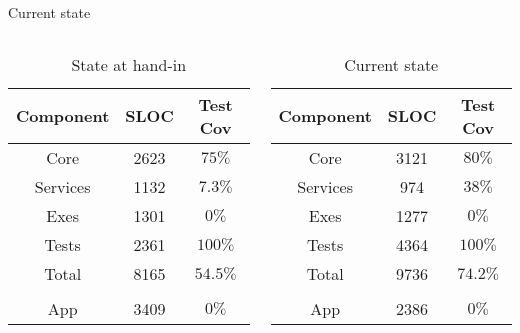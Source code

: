 \documentclass[a4paper]{beamer}
\begin{document}
\begin{frame}{Current state}
    \begin{columns}
        \begin{column}{0.48\textwidth}
            \begin{table}
                \centering
                \begin{tabular}{c|c|c}
                    Component & SLOC  & Test Cov\\
                    \hline
                    Core      & 2623 & $75\%$\\
                    Services  & 1132 & $7.3\%$\\
                    Exes      & 1301 & $0\%$\\
                    Tests     & 2361 & $100\%$\\
                    \hline
                    Total     & 8165 & $54.5\%$\\
                    &&\\
                    App       & 3409 & $0\%$
                \end{tabular}
                \caption{State at hand-in}
            \end{table}
        \end{column}
        \begin{column}{0.48\textwidth}
            \begin{table}
                \centering
                \begin{tabular}{c|c|c}
                    Component & SLOC  & Test Cov\\
                    \hline
                    Core      & 3121 & $80\%$\\
                    Services  &  974 & $38\%$\\
                    Exes      & 1277 & $0\%$\\
                    Tests     & 4364 & $100\%$\\
                    \hline
                    Total     & 9736 & $74.2\%$\\
                    &&\\
                    App       & 2386 & $0\%$
                \end{tabular}
                \caption{Current state}
            \end{table}
        \end{column}
    \end{columns}
\end{frame}
\end{document}

